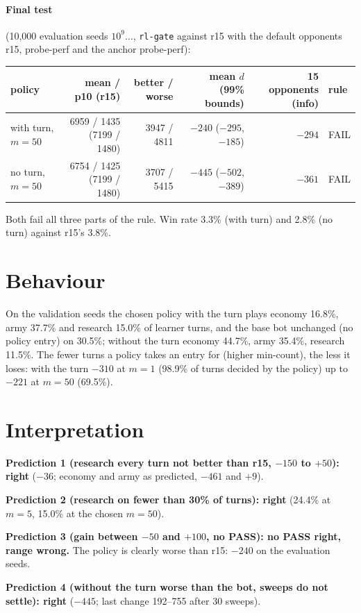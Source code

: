 \documentclass{../polyexp}
\begin{document}
\paragraph{Final test} (10{,}000 evaluation seeds $10^9\dots$, \texttt{rl-gate} against r15 with the default
opponents r15, probe-perf and the anchor probe-perf):

\begin{center}\small
\begin{tabular}{lrrrrl}
\toprule
policy & mean / p10 (r15) & better / worse & mean $d$ (99\% bounds) & 15 opponents (info) & rule \\
\midrule
with turn, $m=50$ & 6959 / 1435 (7199 / 1480) & 3947 / 4811 & $-240$ ($-295$, $-185$) & $-294$ & FAIL \\
no turn, $m=50$   & 6754 / 1425 (7199 / 1480) & 3707 / 5415 & $-445$ ($-502$, $-389$) & $-361$ & FAIL \\
\bottomrule
\end{tabular}
\end{center}
Both fail all three parts of the rule. Win rate 3.3\% (with turn) and 2.8\% (no turn) against r15's 3.8\%.

\section{Behaviour}
On the validation seeds the chosen policy with the turn plays economy 16.8\%, army 37.7\% and research 15.0\% of
learner turns, and the base bot unchanged (no policy entry) on 30.5\%; without the turn economy 44.7\%, army 35.4\%,
research 11.5\%. The fewer turns a policy takes an entry for (higher min-count), the less it loses: with the turn
$-310$ at $m=1$ (98.9\% of turns decided by the policy) up to $-221$ at $m=50$ (69.5\%).

\section{Interpretation}
\textbf{Prediction 1 (research every turn not better than r15, $-150$ to $+50$): right} ($-36$; economy and army as
predicted, $-461$ and $+9$).

\textbf{Prediction 2 (research on fewer than 30\% of turns): right} (24.4\% at $m=5$, 15.0\% at the chosen $m=50$).

\textbf{Prediction 3 (gain between $-50$ and $+100$, no PASS): no PASS right, range wrong.} The policy is clearly
worse than r15: $-240$ on the evaluation seeds.

\textbf{Prediction 4 (without the turn worse than the bot, sweeps do not settle): right} ($-445$; last change
192--755 after 30 sweeps).
\end{document}
